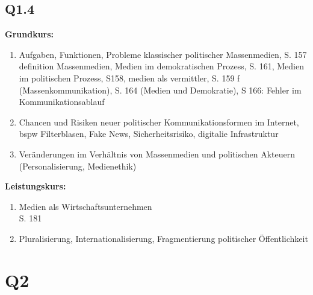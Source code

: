 \documentclass[12pt, letterpaper]{article}
\begin{document}
\subsection{Q1.4}
\label{sec:Q1.4}
\textbf{Grundkurs:} 
\begin{enumerate}
  \item Aufgaben, Funktionen, Probleme klassischer politischer Massenmedien,
    S. 157 definition Massenmedien, Medien im demokratischen Prozess,
    S. 161, Medien im politischen Prozess, S158, medien als vermittler, S. 159 f (Massenkommunikation),
    S. 164 (Medien und Demokratie), S 166: Fehler im Kommunikationsablauf
  \item Chancen und Risiken neuer politischer Kommunikationsformen im Internet, bspw Filterblasen, Fake News, Sicherheitsrisiko, digitalie Infrastruktur
  \item Veränderungen  im Verhältnis von Massenmedien und politischen Akteuern (Personalisierung, Medienethik)
\end{enumerate}
\textbf{Leistungskurs:}
\begin{enumerate}
  \item Medien als Wirtschaftsunternehmen\\
    S. 181 
  \item Pluralisierung, Internationalisierung, Fragmentierung politischer Öffentlichkeit
\end{enumerate}
\newpage
\section{Q2}
\label{sec:Q2}
\end{document}
